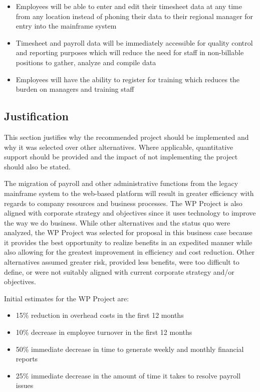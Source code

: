 \documentclass[11pt]{article}
\begin{document}
\begin{itemize}
\item Employees will be able to enter and edit their timesheet data at any time from any location instead of phoning their data to their regional manager for entry into the mainframe system
\item Timesheet and payroll data will be immediately accessible for quality control and reporting purposes which will reduce the need for staff in non-billable positions to gather, analyze and compile data
\item Employees will have the ability to register for training which reduces the burden on managers and training staff
\end{itemize}
\subsection{Justification}
\label{sec:orgcb359ab}
This section justifies why the recommended project should be implemented and why it was selected over other alternatives. Where applicable, quantitative support should be provided and the impact of not implementing the project should also be stated.

The migration of payroll and other administrative functions from the legacy mainframe system to the web-based platform will result in greater efficiency with regards to company resources and business processes. The WP Project is also aligned with corporate strategy and objectives since it uses technology to improve the way we do business. While other alternatives and the status quo were analyzed, the WP Project was selected for proposal in this business case because it provides the best opportunity to realize benefits in an expedited manner while also allowing for the greatest improvement in efficiency and cost reduction. Other alternatives assumed greater risk, provided less benefits, were too difficult to define, or were not suitably aligned with current corporate strategy and/or objectives.

Initial estimates for the WP Project are:

\begin{itemize}
\item 15\% reduction in overhead costs in the first 12 months
\item 10\% decrease in employee turnover in the first 12 months
\item 50\% immediate decrease in time to generate weekly and monthly financial reports
\item 25\% immediate decrease in the amount of time it takes to resolve payroll issues
\end{itemize}
\end{document}
